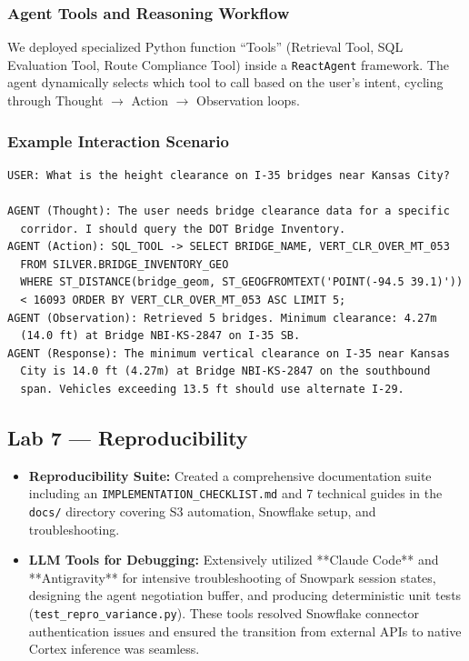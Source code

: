 \documentclass[11pt,letterpaper]{article}
\begin{document}
\subsubsection{Agent Tools and Reasoning Workflow}
We deployed specialized Python function ``Tools'' (Retrieval Tool, SQL Evaluation Tool, Route Compliance Tool) inside a \texttt{ReactAgent} framework. The agent dynamically selects which tool to call based on the user's intent, cycling through Thought $\rightarrow$ Action $\rightarrow$ Observation loops.

\subsubsection{Example Interaction Scenario}
\begin{lstlisting}[caption={Example dispatcher interaction with the AI agent}]
USER: What is the height clearance on I-35 bridges near Kansas City?

AGENT (Thought): The user needs bridge clearance data for a specific
  corridor. I should query the DOT Bridge Inventory.
AGENT (Action): SQL_TOOL -> SELECT BRIDGE_NAME, VERT_CLR_OVER_MT_053
  FROM SILVER.BRIDGE_INVENTORY_GEO
  WHERE ST_DISTANCE(bridge_geom, ST_GEOGFROMTEXT('POINT(-94.5 39.1)'))
  < 16093 ORDER BY VERT_CLR_OVER_MT_053 ASC LIMIT 5;
AGENT (Observation): Retrieved 5 bridges. Minimum clearance: 4.27m
  (14.0 ft) at Bridge NBI-KS-2847 on I-35 SB.
AGENT (Response): The minimum vertical clearance on I-35 near Kansas
  City is 14.0 ft (4.27m) at Bridge NBI-KS-2847 on the southbound
  span. Vehicles exceeding 13.5 ft should use alternate I-29.
\end{lstlisting}

\subsection{Lab 7 --- Reproducibility}

\begin{itemize}[nosep]
  \item \textbf{Reproducibility Suite:} Created a comprehensive documentation suite including an \texttt{IMPLEMENTATION\_CHECKLIST.md} and 7 technical guides in the \texttt{docs/} directory covering S3 automation, Snowflake setup, and troubleshooting.
  \item \textbf{LLM Tools for Debugging:} Extensively utilized **Claude Code** and **Antigravity** for intensive troubleshooting of Snowpark session states, designing the agent negotiation buffer, and producing deterministic unit tests (\texttt{test\_repro\_variance.py}). These tools resolved Snowflake connector authentication issues and ensured the transition from external APIs to native Cortex inference was seamless.
\end{itemize}
\end{document}
